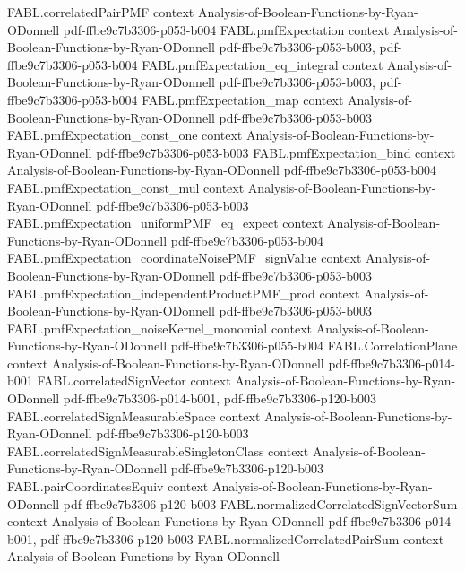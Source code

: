 \begin{theorem}
  {FABL.correlatedPairPMF}
  {context}
  {Analysis-of-Boolean-Functions-by-Ryan-ODonnell}
  {pdf-ffbe9c7b3306-p053-b004}
\proofstep
  {FABL.pmfExpectation}
  {context}
  {Analysis-of-Boolean-Functions-by-Ryan-ODonnell}
  {pdf-ffbe9c7b3306-p053-b003,
    pdf-ffbe9c7b3306-p053-b004}
\proofstep
  {FABL.pmfExpectation_eq_integral}
  {context}
  {Analysis-of-Boolean-Functions-by-Ryan-ODonnell}
  {pdf-ffbe9c7b3306-p053-b003,
    pdf-ffbe9c7b3306-p053-b004}
\proofstep
  {FABL.pmfExpectation_map}
  {context}
  {Analysis-of-Boolean-Functions-by-Ryan-ODonnell}
  {pdf-ffbe9c7b3306-p053-b003}
\proofstep
  {FABL.pmfExpectation_const_one}
  {context}
  {Analysis-of-Boolean-Functions-by-Ryan-ODonnell}
  {pdf-ffbe9c7b3306-p053-b003}
\proofstep
  {FABL.pmfExpectation_bind}
  {context}
  {Analysis-of-Boolean-Functions-by-Ryan-ODonnell}
  {pdf-ffbe9c7b3306-p053-b004}
\proofstep
  {FABL.pmfExpectation_const_mul}
  {context}
  {Analysis-of-Boolean-Functions-by-Ryan-ODonnell}
  {pdf-ffbe9c7b3306-p053-b003}
\proofstep
  {FABL.pmfExpectation_uniformPMF_eq_expect}
  {context}
  {Analysis-of-Boolean-Functions-by-Ryan-ODonnell}
  {pdf-ffbe9c7b3306-p053-b004}
\proofstep
  {FABL.pmfExpectation_coordinateNoisePMF_signValue}
  {context}
  {Analysis-of-Boolean-Functions-by-Ryan-ODonnell}
  {pdf-ffbe9c7b3306-p053-b003}
\proofstep
  {FABL.pmfExpectation_independentProductPMF_prod}
  {context}
  {Analysis-of-Boolean-Functions-by-Ryan-ODonnell}
  {pdf-ffbe9c7b3306-p053-b003}
\proofstep
  {FABL.pmfExpectation_noiseKernel_monomial}
  {context}
  {Analysis-of-Boolean-Functions-by-Ryan-ODonnell}
  {pdf-ffbe9c7b3306-p055-b004}
\proofstep
  {FABL.CorrelationPlane}
  {context}
  {Analysis-of-Boolean-Functions-by-Ryan-ODonnell}
  {pdf-ffbe9c7b3306-p014-b001}
\proofstep
  {FABL.correlatedSignVector}
  {context}
  {Analysis-of-Boolean-Functions-by-Ryan-ODonnell}
  {pdf-ffbe9c7b3306-p014-b001,
    pdf-ffbe9c7b3306-p120-b003}
\proofstep
  {FABL.correlatedSignMeasurableSpace}
  {context}
  {Analysis-of-Boolean-Functions-by-Ryan-ODonnell}
  {pdf-ffbe9c7b3306-p120-b003}
\proofstep
  {FABL.correlatedSignMeasurableSingletonClass}
  {context}
  {Analysis-of-Boolean-Functions-by-Ryan-ODonnell}
  {pdf-ffbe9c7b3306-p120-b003}
\proofstep
  {FABL.pairCoordinatesEquiv}
  {context}
  {Analysis-of-Boolean-Functions-by-Ryan-ODonnell}
  {pdf-ffbe9c7b3306-p120-b003}
\proofstep
  {FABL.normalizedCorrelatedSignVectorSum}
  {context}
  {Analysis-of-Boolean-Functions-by-Ryan-ODonnell}
  {pdf-ffbe9c7b3306-p014-b001,
    pdf-ffbe9c7b3306-p120-b003}
\proofstep
  {FABL.normalizedCorrelatedPairSum}
  {context}
  {Analysis-of-Boolean-Functions-by-Ryan-ODonnell}

\end{theorem}
